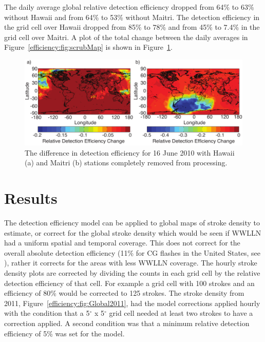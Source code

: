 The daily average global relative detection efficiency dropped from 64\% to 63\% without Hawaii and from 64\% to 53\% without Maitri.
The detection efficiency in the grid cell over Hawaii dropped from 85\% to 78\% and from 45\% to 7.4\% in the grid cell over Maitri.
A plot of the total change between the daily averages in Figure~\ref{efficiency:fig:scrubMap} is shown in Figure~\ref{efficiency:fig:scrub}.

\begin{figure}[ht!]
   \centering
\noindent\includegraphics[width=39pc]{efficiency/Figures/2012RS005049-p13.pdf}
\caption{The difference in detection efficiency for 16 June 2010 with Hawaii (a) and Maitri (b) stations completely removed from processing.}
\label{efficiency:fig:scrub}
\end{figure}

\section{Results}

The detection efficiency model can be applied to global maps of stroke density to estimate, or correct for the global stroke density which would be seen if WWLLN had a uniform spatial and temporal coverage.
This does not correct for the overall absolute detection efficiency (11\% for CG flashes in the United States, see \citet{Abarca2010}), rather it corrects for the areas with less WWLLN coverage.
The hourly stroke density plots are corrected by dividing the counts in each grid cell by the relative detection efficiency of that cell.
For example a grid cell with 100 strokes and an efficiency of 80\% would be corrected to 125 strokes.
The stroke density from 2011, Figure~\ref{efficiency:fig:Global2011}, had the model corrections applied hourly with the condition that a 5$^\circ$ x 5$^\circ$ grid cell needed at least two strokes to have a correction applied.
A second condition was that a minimum relative detection efficiency of 5\% was set for the model.

